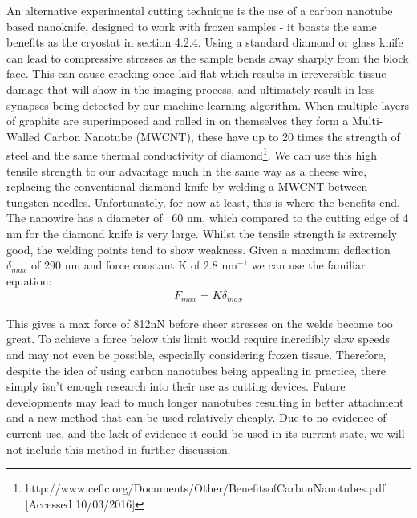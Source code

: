 \documentclass[a4paper, 11pt]{article}
\numberwithin{equation}{section}
\begin{document}
	An alternative experimental cutting technique is the use of a carbon nanotube based nanoknife, designed to work with frozen samples - it boasts the same benefits as the cryostat in section 4.2.4. Using a standard diamond or glass knife can lead to compressive stresses  as the sample bends away sharply from the block face. This can cause cracking once laid flat which results in irreversible tissue damage that will show in the imaging process, and ultimately result in less synapses being detected by our machine learning algorithm\cite{singh2009fabrication}. When multiple layers of graphite are superimposed and rolled in on themselves they form a Multi-Walled Carbon Nanotube (MWCNT), these have up to 20 times the strength of steel and the same thermal conductivity of diamond\footnote{http://www.cefic.org/Documents/Other/BenefitsofCarbonNanotubes.pdf [Accessed 10/03/2016]}. We can use this high tensile strength to our advantage much in the same way as a cheese wire, replacing the conventional diamond knife by welding a MWCNT between tungsten needles. Unfortunately, for now at least, this is where the benefits end. The nanowire has a diameter of ~60 nm, which compared to the cutting edge of 4 nm for the diamond knife is very large. Whilst the tensile strength is extremely good, the welding points tend to show weakness. Given a maximum deflection $\delta_{max}$ of 290  nm and force constant K of 2.8 nm$^{-1}$ we can use the familiar equation:
	\begin{align}
	F_{max} = K\delta_{max}\nonumber 
	\end{align}
	
	This gives a max force of 812nN\cite{singh2009fabrication} before sheer stresses on the welds become too great. To achieve a force below this limit would require incredibly slow speeds and may not even be possible, especially considering frozen tissue. Therefore, despite the idea of using carbon nanotubes being appealing in practice, there simply isn't enough research into their use as cutting devices. Future developments may lead to much longer nanotubes resulting in better attachment and a new method that can be used relatively cheaply. Due to no evidence of current use, and the lack of evidence it could be used in its current state, we will not include this method in further discussion.
	\newpage
\end{document}
